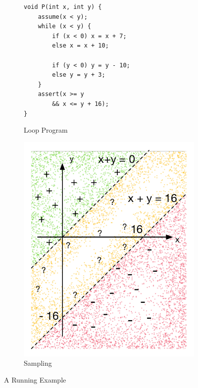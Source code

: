 \begin{figure}[t]
\begin{subfigure}{0.2\textwidth}
    \centering
    \vspace{0.5cm}
{\scriptsize\begin{verbatim}
void P(int x, int y) {
    assume(x < y);
    while (x < y) {
        if (x < 0) x = x + 7;
        else x = x + 10;

        if (y < 0) y = y - 10;
        else y = y + 3;
    }
    assert(x >= y
        && x <= y + 16);
}
\end{verbatim}}
    \vspace{0.5cm}
    \caption{Loop Program}
    \label{fig:running:example:program}
\end{subfigure}%
\begin{subfigure}{.3\textwidth}
      \centering
      \includegraphics[scale=0.42]{figures/running-sampling.pdf}
      \caption{Sampling}
      \label{fig:running:example:sampling}
\end{subfigure}
\caption{A Running Example}
\label{fig:running:example}
\end{figure}


